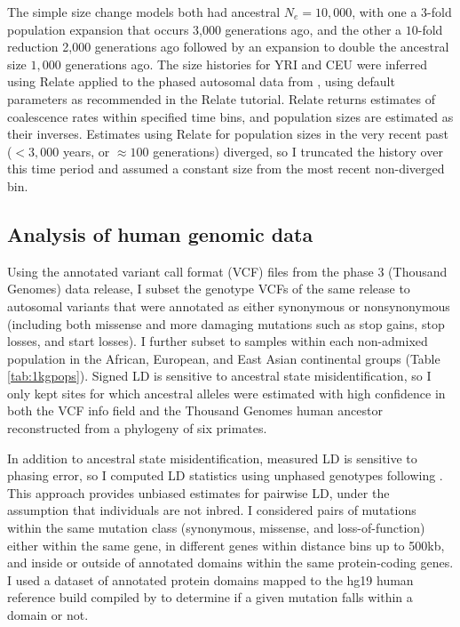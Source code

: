 \documentclass[]{article}
\begin{document}
The simple size change models both had ancestral \(N_e=10,000\), with one a
\(3\)-fold population expansion that occurs 3,000 generations ago, and the other
a \(10\)-fold reduction 2,000 generations ago followed by an expansion to double
the ancestral size \(1,000\) generations ago. The size histories for YRI and CEU
were inferred using Relate \citep{Speidel2019-nj} applied to the phased autosomal
data from \citet{1000_Genomes_Project_Consortium2015-zq}, using default parameters as
recommended in the Relate tutorial. Relate returns estimates of coalescence
rates within specified time bins, and population sizes are estimated as their
inverses. Estimates using Relate for population sizes in the very recent past
(\(<3,000\) years, or \(\approx 100\) generations) diverged, so I truncated the
history over this time period and assumed a constant size from the most recent
non-diverged bin.

\subsection{Analysis of human genomic data}
\label{analysis-of-human-genomic-data}

Using the annotated variant call format (VCF) files from the phase 3
\citet{1000_Genomes_Project_Consortium2015-zq} (Thousand Genomes) data release, I
subset the genotype VCFs of the same release to autosomal variants that were
annotated as either synonymous or nonsynonymous (including both missense and
more damaging mutations such as stop gains, stop losses, and start losses). I
further subset to samples within each non-admixed population in the African,
European, and East Asian continental groups (Table \ref{tab:1kgpops}). Signed
LD is sensitive to ancestral state misidentification, so I only kept sites for
which ancestral alleles were estimated with high confidence in both the VCF
info field and the Thousand Genomes human ancestor reconstructed from a
phylogeny of six primates.

In addition to ancestral state misidentification, measured LD is sensitive to
phasing error, so I computed LD statistics using unphased genotypes following
\citet{Ragsdale2020-nz}. This approach provides unbiased estimates for pairwise LD,
under the assumption that individuals are not inbred. I considered pairs of
mutations within the same mutation class (synonymous, missense, and
loss-of-function) either within the same gene, in different genes within
distance bins up to 500kb, and inside or outside of annotated domains within
the same protein-coding genes. I used a dataset of annotated protein domains
mapped to the hg19 human reference build compiled by \citet{Stanek2020-pa} to
determine if a given mutation falls within a domain or not.
\end{document}
